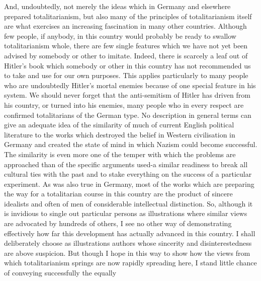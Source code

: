 \documentclass[11pt,openany]{book}
\begin{document}
And, undoubtedly, not merely the ideas which in Germany and elsewhere prepared totalitarianism, but also many of the principles of totalitarianism itself are what exercises an increasing fascination in many other countries. Although few people, if anybody, in this country would probably be ready to swallow totalitarianism whole, there are few single features which we have not yet been advised by somebody or other to imitate. Indeed, there is scarcely a leaf out of Hitler's book which somebody or other in this country has not recommended us to take and use for our own purposes. This applies particularly to many people who are undoubtedly Hitler's mortal enemies because of one special feature in his system. We should never forget that the anti-semitism of Hitler has driven from his country, or turned into his enemies, many people who in every respect are confirmed totalitarians of the German type. No description in general terms can give an adequate idea of the similarity of much of current English political literature to the works which destroyed the belief in Western civilisation in Germany and created the state of mind in which Nazism could become successful. The similarity is even more one of the temper with which the problems are approached than of the specific arguments used-a similar readiness to break all cultural ties with the past and to stake everything on the success of a particular experiment. As was also true in Germany, most of the works which are preparing the way for a totalitarian course in this country are the product of sincere idealists and often of men of considerable intellectual distinction. So, although it is invidious to single out particular persons as illustrations where similar views are advocated by hundreds of others, I see no other way of demonstrating effectively how far this development has actually advanced in this country. I shall deliberately choose as illustrations authors whose sincerity and disinterestedness are above suspicion. But though I hope in this way to show how the views from which totalitarianism springs are now rapidly spreading here, I stand little chance of conveying successfully the equally
\end{document}
